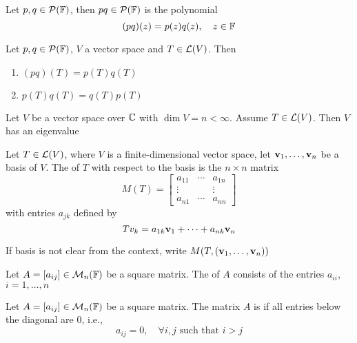 \documentclass[aspectratio=169]{beamer}
\begin{document}
\begin{frame}
\begin{definition}
Let $p,q\in\mathcal{P}(\mathbb{F})$, then $pq\in\mathcal{P}(\mathbb{F})$ is the polynomial
\[
(pq)(z)=p(z)q(z),\quad z\in\mathbb{F}
\]
\end{definition}
\vfill
\begin{theorem}
Let $p,q\in\mathcal{P}(\mathbb{F})$, $V$ a vector space and $T\in\mathcal{L}(V)$. Then
\begin{enumerate}
\item $(pq)(T)=p(T)q(T)$
\item $p(T)q(T)=q(T)p(T)$
\end{enumerate}
\end{theorem}
\end{frame}

\begin{frame}
\begin{importanttheorem}
Let $V$ be a vector space over $\mathbb{C}$ with $\dim V=n<\infty$. Assume $T\in\mathcal{L}(V)$. Then $V$ has an eigenvalue
\end{importanttheorem}
\end{frame}

\begin{frame}
\begin{definition}
Let $T\in\mathcal{L}(V)$, where $V$ is a finite-dimensional vector space, let $\mathbf{v}_1,\ldots,\mathbf{v}_n$ be a basis of $V$. The  of $T$ with respect to the basis is the $n\times n$ matrix
\[
M(T)=
\begin{bmatrix}
a_{11} & \cdots & a_{1n} \\
\vdots & & \vdots \\
a_{n1} & \cdots & a_{nn}
\end{bmatrix}
\]
with entries $a_{jk}$ defined by
\[
Tv_k = a_{1k}\mathbf{v}_1+\cdots+a_{nk}\mathbf{v}_n
\]
\end{definition}
If basis is not clear from the context, write $M(T,(\mathbf{v}_1,\ldots,\mathbf{v}_n))$
\end{frame}

\begin{frame}
\begin{definition}
Let $A=[a_{ij}]\in\mathcal{M}_n(\mathbb{F})$ be a square matrix. The  of $A$ consists of the entries $a_{ii}$, $i=1,\ldots,n$
\end{definition}
\vfill
\begin{definition}
Let $A=[a_{ij}]\in\mathcal{M}_n(\mathbb{F})$ be a square matrix. The matrix $A$ is  if all entries below the diagonal are 0, i.e., 
\[
a_{ij}=0, \quad\forall i,j\textrm{ such that }i> j
\]
\end{definition}
\end{frame}
\end{document}
